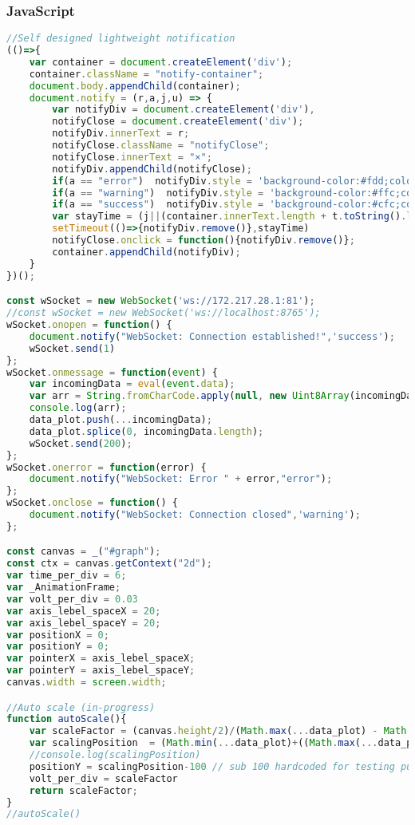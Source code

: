 \subsubsection*{JavaScript}
\begin{lstlisting}[style=htmlcssjs, language=JavaScript]
//Self designed lightweight notification
(()=>{
    var container = document.createElement('div');
    container.className = "notify-container";
    document.body.appendChild(container);
    document.notify = (r,a,j,u) => {
        var notifyDiv = document.createElement('div'),
        notifyClose = document.createElement('div');
        notifyDiv.innerText = r;
        notifyClose.className = "notifyClose";
        notifyClose.innerText = "×";
        notifyDiv.appendChild(notifyClose);
        if(a == "error")  notifyDiv.style = 'background-color:#fdd;color:f00;';
        if(a == "warning")  notifyDiv.style = 'background-color:#ffc;color:f00;';
        if(a == "success")  notifyDiv.style = 'background-color:#cfc;color:#080;';
        var stayTime = (j||(container.innerText.length + t.toString().length)*2e2);
        setTimeout(()=>{notifyDiv.remove()},stayTime)
        notifyClose.onclick = function(){notifyDiv.remove()};
        container.appendChild(notifyDiv);
    }
})();

const wSocket = new WebSocket('ws://172.217.28.1:81');
//const wSocket = new WebSocket('ws://localhost:8765');
wSocket.onopen = function() {
    document.notify("WebSocket: Connection established!",'success');
    wSocket.send(1)
};
wSocket.onmessage = function(event) {
    var incomingData = eval(event.data);
    var arr = String.fromCharCode.apply(null, new Uint8Array(incomingData));
    console.log(arr);
    data_plot.push(...incomingData);
    data_plot.splice(0, incomingData.length);
    wSocket.send(200);
};
wSocket.onerror = function(error) {
    document.notify("WebSocket: Error " + error,"error");
};
wSocket.onclose = function() {
    document.notify("WebSocket: Connection closed",'warning');
};

const canvas = _("#graph");
const ctx = canvas.getContext("2d");
var time_per_div = 6;
var _AnimationFrame;
var volt_per_div = 0.03
var axis_lebel_spaceX = 20;
var axis_lebel_spaceY = 20;
var positionX = 0;
var positionY = 0;
var pointerX = axis_lebel_spaceX;
var pointerY = axis_lebel_spaceY;
canvas.width = screen.width;

//Auto scale (in-progress)
function autoScale(){
    var scaleFactor = (canvas.height/2)/(Math.max(...data_plot) - Math.min(...data_plot));
    var scalingPosition  = (Math.min(...data_plot)+((Math.max(...data_plot) - Math.min(...data_plot))/2))*scaleFactor;
    //console.log(scalingPosition)
    positionY = scalingPosition-100 // sub 100 hardcoded for testing purpose ... must be a flexible solution
    volt_per_div = scaleFactor
    return scaleFactor;
}
//autoScale()


\end{lstlisting}
